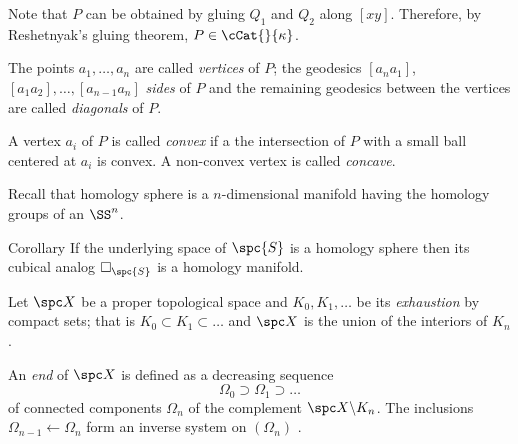 Note that $P$ can be obtained by gluing $Q_1$ and $Q_2$ along $[xy]$.
Therefore, by Reshetnyak's gluing theorem,
$P\in\cCat{}{\kappa}$.
\qeds













The points $a_1,\dots,a_n$ 
are called \emph{vertices} of $P$;
the geodesics $[a_na_1]$, $[a_1a_2],\dots,[a_{n-1}a_n]$ 
\emph{sides} of $P$
and the remaining geodesics between the vertices are called \emph{diagonals} of $P$.

A vertex $a_i$ of $P$ 
is called \emph{convex} if a the intersection of $P$ with a small ball centered at $a_i$ is convex.
A non-convex vertex is called \emph{concave}.















Recall that homology sphere is a $n$-dimensional manifold having the homology groups of an $\SS^n$. 

\begin{thm}{Corollary}\label{cor:flag-hom}
If the underlying space of $\spc{S}$ 
is a homology sphere then its cubical analog $\square_{\spc{S}}$ is a homology manifold.
\end{thm}














Let $\spc X$ be a proper topological space
and $K_0, K_1, \dots$
be its \emph{exhaustion} by compact sets;
that is $K_0\subset K_1\subset \dots$ and $\spc X$ is the union of the interiors of $K_n$.

An \emph{end} of $\spc X$
is defined as a decreasing sequence 
\[\Omega_0\supset \Omega_1\supset \dots\]
of connected components $\Omega_n$ 
of the complement 
$\spc X\backslash K_n$.
The inclusions 
$\Omega_{n-1}\leftarrow \Omega_{n}$
form an inverse system on $(\Omega_n)$ .

